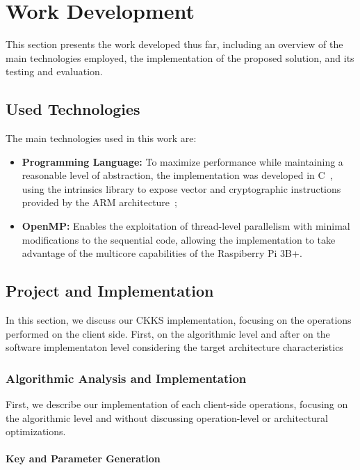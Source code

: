 \chapter{Work Development} \label{cap:desenvolvimento}

This section presents the work developed thus far, including an overview of the main technologies employed, the implementation of the proposed solution, and its testing and evaluation.

\section{Used Technologies}

The main technologies used in this work are:

\begin{itemize}
    \item \textbf{Programming Language:} To maximize performance while maintaining a reasonable level of abstraction, the implementation was developed in C~\cite{iso_c_2018}, using the intrinsics library to expose vector and cryptographic instructions provided by the ARM architecture~\cite{arm_neon_intrinsics};
    \item \textbf{OpenMP:} Enables the exploitation of thread-level parallelism with minimal modifications to the sequential code, allowing the implementation to take advantage of the multicore capabilities of the Raspiberry Pi 3B+.
\end{itemize}

\section{Project and Implementation}

In this section, we discuss our CKKS implementation, focusing on the operations performed on the client side. First, on the algorithmic level and after on the software implementaton level considering the target architecture characteristics

\subsection{Algorithmic Analysis and Implementation}

First, we describe our implementation of each client-side operations, focusing on the algorithmic level and without discussing operation-level or architectural optimizations.

\subsubsection{Key and Parameter Generation}

